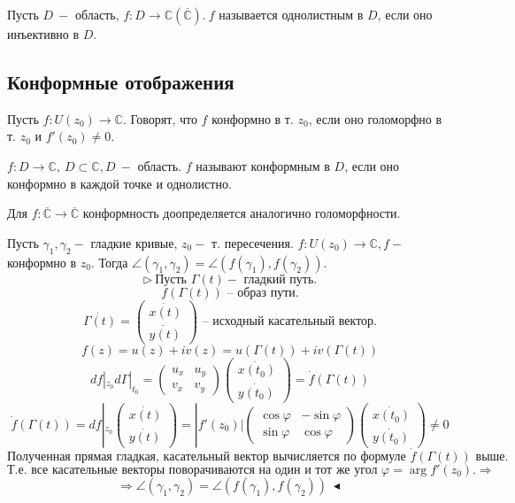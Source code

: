  Пусть $D \ -$ область, $f:D \to \mathbb{C} (\overline{\mathbb{C}}). \ f$ называется однолистным в $D$, если оно инъективно в $D$.

\subsection{Конформные отображения}
 Пусть $f:U(z_0)\to \mathbb{C}$. Говорят, что $f$ конформно в т. $z_0$, если оно голоморфно в т. $z_0$ и $f'(z_0) \neq 0$.

$f:D\to \mathbb{C}, \ D \subset \mathbb{C}, D \ -$ область. $f$ называют конформным в $D$, если оно конформно в каждой точке и однолистно.

Для $f: \overline{\mathbb{C}}\to\overline{\mathbb{C}}$ конформность доопределяется аналогично голоморфности.

 Пусть $\gamma_1, \gamma_2-$ гладкие кривые, $z_0-$ т. пересечения. $f:U(z_0) \to \mathbb{C}, f-$ конформно в $z_0.$ Тогда $\angle(\gamma_1, \gamma_2)=\angle(f(\gamma_1), f(\gamma_2)).$
\[\triangleright \ \text{Пусть $\Gamma(t) - $ гладкий путь.}\]
\[f(\Gamma(t)) \text{ -- образ пути.}\]
\[\dot{\Gamma(t)} = \left(\begin{array}{ll}
\dot{x(t)} \\
\dot{y(t)}   
\end{array}\right) \text{ -- исходный касательный вектор.}\]
\[f(z) = u(z) + iv(z) = u(\Gamma(t)) + iv(\Gamma(t))\]
\[df|_{z_0} d\Gamma|_{t_0} = \left(\begin{array}{ll}
u_x & u_y \\ 
v_x & v_y    
\end{array}
\right) \left(\begin{array}{ll}
\dot{x(t_0)} \\
\dot{y(t_0)}   
\end{array}\right) = \dot{f}(\Gamma(t))\]
\[\dot{f}(\Gamma(t)) = df|_{z_0}\left(\begin{array}{ll}
\dot{x(t)} \\
\dot{y(t)}   
\end{array}\right) = |f'(z_0)|\left(\begin{array}{ll}
\cos \varphi & -\sin \varphi \\
\sin \varphi & \cos \varphi    
\end{array}\right) \left(\begin{array}{ll}
\dot{x(t_0)} \\
\dot{y(t_0)}   
\end{array}\right) \neq 0\]
\[\text{Полученная прямая гладкая, касательный вектор вычисляется по формуле $\dot{f}(\Gamma(t))$ выше.}\]
\[\text{Т.е. все касательные векторы поворачиваются на один и тот же угол } \varphi = \arg f'(z_0). \Rightarrow \]
\[\Rightarrow \angle(\gamma_1, \gamma_2)=\angle(f(\gamma_1), f(\gamma_2)) \ \blacktriangleleft\]

